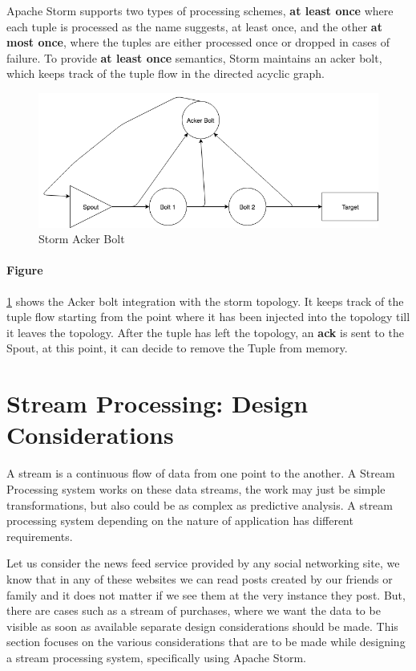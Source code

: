 \documentclass[runningheads,a4paper]{llncs}[2015/06/24]
\begin{document}
Apache Storm supports two types of processing schemes, \textbf{at least once} where each tuple is processed as the name suggests, at least once, and the other \textbf{at most once}, where the tuples are either processed once or dropped in cases of failure. To provide \textbf{at least once} semantics, Storm maintains an acker bolt, which keeps track of the tuple flow in the directed acyclic graph.

\begin{figure}
  \begin{center}
    \includegraphics[width=.7\textwidth]{acker.png}
    \caption{Storm Acker Bolt \cite{stormtwitter}}
    \label{fig:acker}
   \end{center}
\end{figure}

\paragraph{Figure} \ref{fig:acker} shows the Acker bolt integration with the storm topology. It keeps track of the tuple flow starting from the point where it has been injected into the topology till it leaves the topology. After the tuple has left the topology, an \textbf{ack} is sent to the Spout, at this point, it can decide to remove the Tuple from memory.

	\section{Stream Processing: Design Considerations}
A stream is a continuous flow of data from one point to the another. A Stream Processing system works on these data streams, the work may just be simple transformations, but also could be as complex as predictive analysis. A stream processing system depending on the nature of application has different requirements.

Let us consider the news feed service provided by any social networking site, we know that in any of these websites we can read posts created by our friends or family and it does not matter if we see them at the very instance they post. But, there are cases such as a stream of purchases, where we want the data to be visible as soon as available separate design considerations should be made. This section focuses on the various considerations that are to be made while designing a stream processing system, specifically using Apache Storm.
\end{document}
